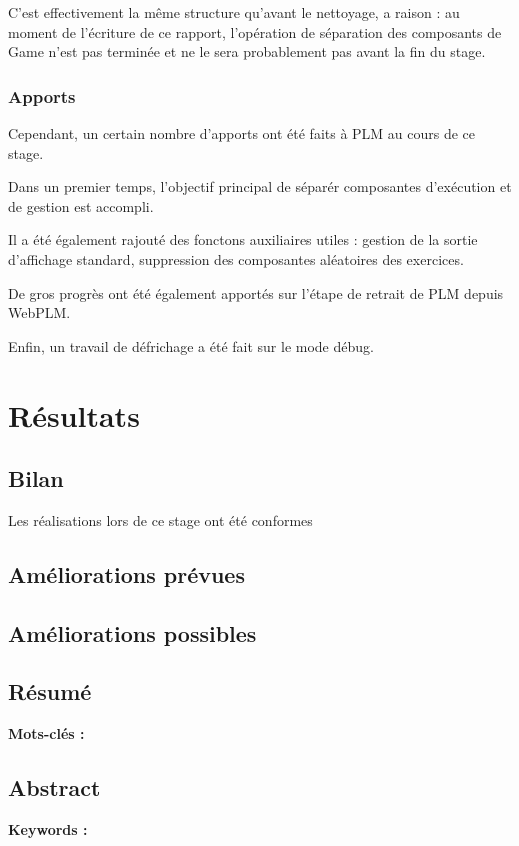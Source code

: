 \documentclass[stage]{tnreport}
\begin{document}
C'est effectivement la même structure qu'avant le nettoyage, a raison : au moment de l'écriture de ce rapport, l'opération de séparation des composants de Game n'est pas terminée et ne le sera probablement pas avant la fin du stage.

 \subsection{Apports}

Cependant, un certain nombre d'apports ont été faits à PLM au cours de ce stage.

Dans un premier temps, l'objectif principal de séparér composantes d'exécution et de gestion est accompli.

Il a été également rajouté des fonctons auxiliaires utiles : gestion de la sortie d'affichage standard, suppression des composantes aléatoires des exercices.

De gros progrès ont été également apportés sur l'étape de retrait de PLM depuis WebPLM.

Enfin, un travail de défrichage a été fait sur le mode débug.

\cleardoublepage 

\chapter{Résultats}

\section{Bilan}

Les réalisations lors de ce stage ont été conformes 

\section{Améliorations prévues}

\section {Améliorations possibles}

\cleardoublepage
\thispagestyle{empty}

\section*{Résumé}

{\bf Mots-clés :}


\section*{Abstract}

{\bf Keywords :}
\end{document}
